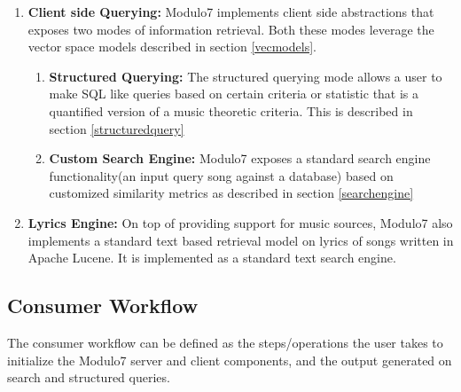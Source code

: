 \documentclass{article}
\begin{document}
\begin{enumerate}
\item \textbf{Client side Querying: } Modulo7 implements client side abstractions that exposes two modes of information retrieval. Both these modes leverage the vector space models described in section \ref{vecmodels}.
\begin{enumerate}
\item \textbf{Structured Querying: } The structured querying mode allows a user to make SQL like queries based on certain criteria or statistic that is a quantified version of a music theoretic criteria. This is described in section \ref{structuredquery}
\item \textbf{Custom Search Engine: } Modulo7 exposes a standard search engine functionality(an input query song against a database) based on  customized similarity metrics as described in section \ref{searchengine} 
\end{enumerate}

\item \textbf{Lyrics Engine: } On top of providing support for music sources, Modulo7 also implements a standard text based retrieval model on lyrics of songs written in Apache Lucene. It is implemented as a standard text search engine.

\end{enumerate}

\subsection{Consumer Workflow} 

The consumer workflow can be defined as the steps/operations the user takes to initialize the Modulo7 server and client components, and the output generated on search and structured queries. 
\end{document}
